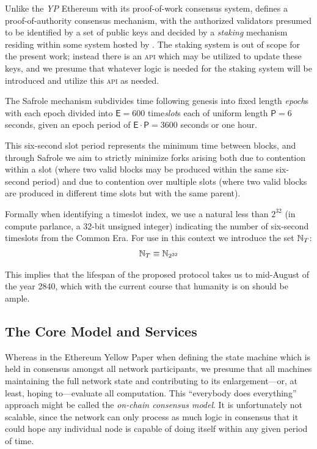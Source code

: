 Unlike the \emph{YP} Ethereum with its proof-of-work consensus system, \Jam defines a proof-of-authority consensus mechanism, with the authorized validators presumed to be identified by a set of public keys and decided by a \emph{staking} mechanism residing within some system hosted by \Jam. The staking system is out of scope for the present work; instead there is an \textsc{api} which may be utilized to update these keys, and we presume that whatever logic is needed for the staking system will be introduced and utilize this \textsc{api} as needed.

The Safrole mechanism subdivides time following genesis into fixed length \emph{epoch}s with each epoch divided into $\mathsf{E} = 600$ time\emph{slot}s each of uniform length $\mathsf{P} = 6$ seconds, given an epoch period of $\mathsf{E}\cdot\mathsf{P} = 3600$ seconds or one hour.

This six-second slot period represents the minimum time between \Jam blocks, and through Safrole we aim to strictly minimize forks arising both due to contention within a slot (where two valid blocks may be produced within the same six-second period) and due to contention over multiple slots (where two valid blocks are produced in different time slots but with the same parent).

Formally when identifying a timeslot index, we use a natural less than $2^{32}$ (in compute parlance, a 32-bit unsigned integer) indicating the number of six-second timeslots from the \Jam Common Era. For use in this context we introduce the set $\mathbb{N}_T$:
\begin{align}\label{eq:time}
  \mathbb{N}_T \equiv \mathbb{N}_{2^{32}}
\end{align}

This implies that the lifespan of the proposed protocol takes us to mid-August of the year 2840, which with the current course that humanity is on should be ample.

\subsection{The Core Model and Services}\label{sec:coremodelandservices}

Whereas in the Ethereum Yellow Paper when defining the state machine which is held in consensus amongst all network participants, we presume that all machines maintaining the full network state and contributing to its enlargement---or, at least, hoping to---evaluate all computation. This ``everybody does everything'' approach might be called the \emph{on-chain consensus model}. It is unfortunately not scalable, since the network can only process as much logic in consensus that it could hope any individual node is capable of doing itself within any given period of time.

